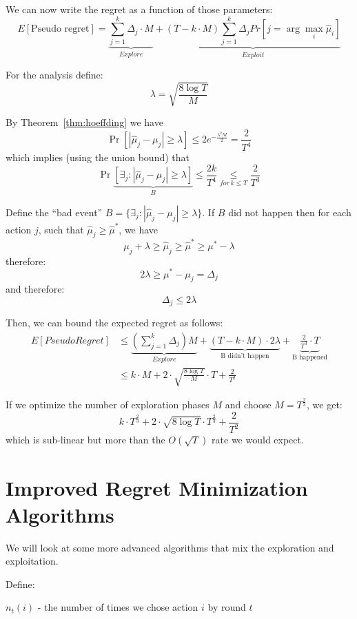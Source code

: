 We can now write the regret as a function of those parameters:
\[
E\left[\text{Pseudo regret}\right]=\underbrace{{\displaystyle
\sum_{j=1}^{k}\Delta_{j}\cdot
M}}_{Explore}+\underbrace{\left(T-k\cdot M\right){\displaystyle
\sum_{j=1}^{k}\Delta_{j}Pr\left[j=\arg\max_{i}\hat{\mu}_{i}\right]}}_{Exploit}
\]

For the analysis define:
\[
\lambda=\sqrt{\frac{8\log T}{M}}
\]

By Theorem~\ref{thm:hoeffding} we have
\[
\Pr\left[\left|\hat{\mu}_{j}-\mu_{j}\right|\ge\lambda\right]  \le
2e^{-\frac{\lambda^2 M}{2}}=\frac{2}{T^{4}}
\]
which implies (using the union bound) that
\[
\Pr\underbrace{\left[\exists_{j}:\left|\hat{\mu}_{j}-\mu_{j}\right|\ge\lambda\right]}_{B}
 \le  \frac{2k}{T^{4}}\underset{for\,k\leq T}{\leq}\frac{2}{T^{3}}
\]

Define the ``bad event''
$B=\{\exists_{j}:\left|\hat{\mu}_{j}-\mu_{j}\right|\ge\lambda\}$. If
$B$ did not happen then for each action $j$, such that
$\hat{\mu}_{j}\ge\hat{\mu}^{*}$, we have
\[
\mu_{j}+\lambda\ge\hat{\mu}_{j}\ge\hat{\mu}^{*}\ge\mu^{*}-\lambda
\]
therefore:
\[
2\lambda\ge\mu^{*}-\mu_{j}=\Delta_{j}
\]
and therefore:
\[
\Delta_{j}\le2\lambda
\]

Then, we can bound the expected regret as follows:
\begin{align*}
E[PseudoRegret] & \leq  \underbrace{\left({\displaystyle
\sum_{j=1}^{k}\Delta_{j}}\right)M}_{Explore}+\underbrace{\left(T-k\cdot
M\right)\cdot2\lambda}_{\text{B didn't
happen}}+\underbrace{\frac{2}{T^{3}}\cdot T}_{\text{B happened}}\\
 & \leq  k\cdot M+2\cdot\sqrt{\frac{8\log T}{M}}\cdot T+\frac{2}{T^{2}}
\end{align*}

If we optimize the number of exploration phases $M$ and choose $M=T^{\frac{2}{3}}$,
we get:
\[
k\cdot T^{\frac{2}{3}}+2\cdot\sqrt{8\log T}\cdot
T^{\frac{2}{3}}+\frac{2}{T^{2}}
\]
which is sub-linear but more than the $O(\sqrt{T})$ rate we would
expect.

\section{Improved Regret Minimization Algorithms}

We will look at some more advanced algorithms that mix the
exploration and exploitation.

Define:

$n_{t}(i)$ - the number of times we chose action $i$ by round $t$

